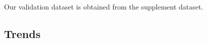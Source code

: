 \documentclass[lang=english,inputenc=utf8,fontsize=10pt]{ldvarticle}
\begin{document}
Our validation dataset is obtained from the supplement dataset.


\subsection{Trends}
            
\end{document}
